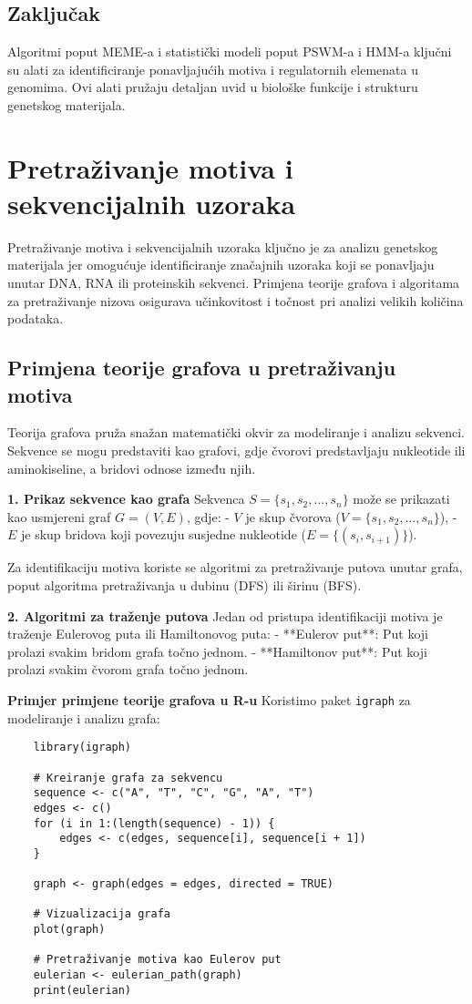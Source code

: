 \documentclass[10pt,a4paper,twoside]{article}
\begin{document}
\subsection*{Zaključak}

Algoritmi poput MEME-a i statistički modeli poput PSWM-a i HMM-a ključni su alati za identificiranje ponavljajućih motiva i regulatornih elemenata u genomima. Ovi alati pružaju detaljan uvid u biološke funkcije i strukturu genetskog materijala.

\section*{Pretraživanje motiva i sekvencijalnih uzoraka}

Pretraživanje motiva i sekvencijalnih uzoraka ključno je za analizu genetskog materijala jer omogućuje identificiranje značajnih uzoraka koji se ponavljaju unutar DNA, RNA ili proteinskih sekvenci. Primjena teorije grafova i algoritama za pretraživanje nizova osigurava učinkovitost i točnost pri analizi velikih količina podataka.

\subsection*{Primjena teorije grafova u pretraživanju motiva}

Teorija grafova pruža snažan matematički okvir za modeliranje i analizu sekvenci. Sekvence se mogu predstaviti kao grafovi, gdje čvorovi predstavljaju nukleotide ili aminokiseline, a bridovi odnose između njih.

\textbf{1. Prikaz sekvence kao grafa}  
Sekvenca \( S = \{s_1, s_2, \ldots, s_n\} \) može se prikazati kao usmjereni graf \( G = (V, E) \), gdje:
- \( V \) je skup čvorova (\( V = \{s_1, s_2, \ldots, s_n\} \)),
- \( E \) je skup bridova koji povezuju susjedne nukleotide (\( E = \{(s_i, s_{i+1})\} \)).

Za identifikaciju motiva koriste se algoritmi za pretraživanje putova unutar grafa, poput algoritma pretraživanja u dubinu (DFS) ili širinu (BFS).

\textbf{2. Algoritmi za traženje putova}  
Jedan od pristupa identifikaciji motiva je traženje Eulerovog puta ili Hamiltonovog puta:
- **Eulerov put**: Put koji prolazi svakim bridom grafa točno jednom.
- **Hamiltonov put**: Put koji prolazi svakim čvorom grafa točno jednom.

\textbf{Primjer primjene teorije grafova u R-u}  
Koristimo paket \texttt{igraph} za modeliranje i analizu grafa:
\begin{verbatim}
	library(igraph)
	
	# Kreiranje grafa za sekvencu
	sequence <- c("A", "T", "C", "G", "A", "T")
	edges <- c()
	for (i in 1:(length(sequence) - 1)) {
		edges <- c(edges, sequence[i], sequence[i + 1])
	}
	
	graph <- graph(edges = edges, directed = TRUE)
	
	# Vizualizacija grafa
	plot(graph)
	
	# Pretraživanje motiva kao Eulerov put
	eulerian <- eulerian_path(graph)
	print(eulerian)
\end{verbatim}
\end{document}
